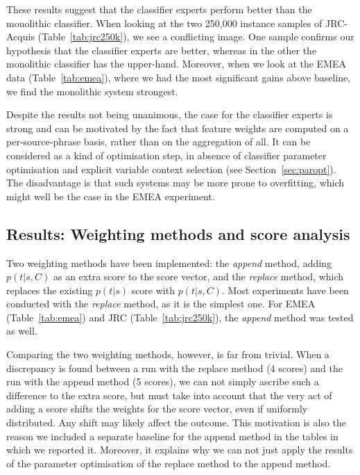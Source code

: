\documentclass[smallextended]{svjour3}       %
\theoremstyle{break}
\begin{document}
These results suggest that the classifier experts perform better than the
monolithic classifier. When looking at the two 250,000 instance samples of
JRC-Acquis (Table~\ref{tab:jrc250k}), we see a conflicting image. One sample
confirms our hypothesis that the classifier experts are better, whereas in the
other the monolithic classifier has the upper-hand. Moreover, when we look at
the EMEA data (Table~\ref{tab:emea}), where we had the most significant gains
above baseline, we find the monolithic system strongest. 

Despite the results not being unanimous, the case for the classifier experts is
strong and can be motivated by the fact that feature weights are computed on a
per-source-phrase basis, rather than on the aggregation of all. It can be
considered as a kind of optimisation step, in absence of classifier parameter
optimisation and explicit variable context selection (see Section~\ref{sec:paropt}). The
disadvantage is that such systems may be more prone to overfitting, which might
well be the case in the EMEA experiment.


\subsection{Results: Weighting methods and score analysis}
\label{sec:weighting}

Two weighting methods have been implemented: the \emph{append} method, adding
$p(t|s,C)$ as an extra score to the score vector, and the \emph{replace}
method, which replaces the existing $p(t|s)$ score with $p(t|s,C)$. Most
experiments have been conducted with the \emph{replace} method, as it is the
simplest one. For EMEA (Table~\ref{tab:emea}) and JRC
(Table~\ref{tab:jrc250k}), the \emph{append} method was tested as well.

Comparing the two weighting methods, however, is far from trivial. When a
discrepancy is found between a run with the replace method (4 scores) and the
run with the append method (5 scores), we can not simply ascribe such a
difference to the extra score, but must take into account that the very act of
adding a score shifts the weights for the score vector, even if uniformly
distributed. Any shift may likely affect the outcome. This
motivation is also the reason we included a separate baseline for the append
method in the tables in which we reported it. Moreover, it explains why we can
not just apply the results of the parameter optimisation of the replace method
to the append method.
\end{document}
